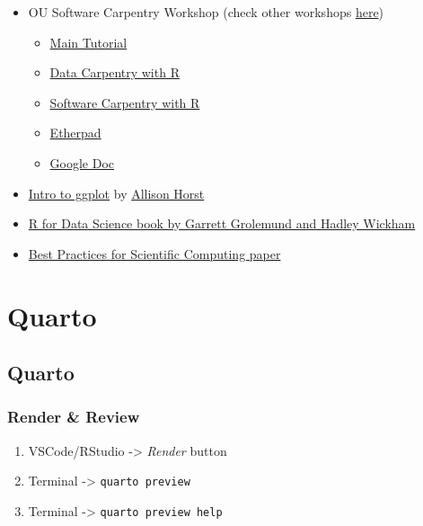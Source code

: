 \documentclass[
  letterpaper,
  DIV=11,
  numbers=noendperiod]{scrreprt}
\providecommand{\tightlist}{%
  \setlength{\itemsep}{0pt}\setlength{\parskip}{0pt}}\usepackage{longtable,booktabs,array}
\begin{document}
\begin{itemize}
\tightlist
\item
  OU Software Carpentry Workshop (check other workshops
  \href{https://libraries.ou.edu/content/software-and-data-carpentry}{here})

  \begin{itemize}
  \tightlist
  \item
    \href{https://oulib-swc.github.io/2019-05-15-ou-swc/}{Main Tutorial}
  \item
    \href{https://datacarpentry.org/R-ecology-lesson/index.html}{Data
    Carpentry with R}
  \item
    \href{https://swcarpentry.github.io/r-novice-gapminder/}{Software
    Carpentry with R}
  \item
    \href{https://pad.carpentries.org/2019-05-15-ou-swc}{Etherpad}
  \item
    \href{https://docs.google.com/document/d/1aJq_X1uhaNkUj7qdZEzOcpc2Pky7eZPy76yqs0UkfrQ/edit}{Google
    Doc}
  \end{itemize}
\item
  \href{https://rawcdn.githack.com/allisonhorst/data-vis/fc107e063f50ef8695b0a75ed73d74720aca2c65/data_vis_np.html}{Intro
  to ggplot} by \href{https://github.com/allisonhorst}{Allison Horst}
\item
  \href{https://r4ds.had.co.nz/}{R for Data Science book by Garrett
  Grolemund and Hadley Wickham}
\item
  \href{http://journals.plos.org/plosbiology/article?id=10.1371/journal.pbio.1001745}{Best
  Practices for Scientific Computing paper}
\end{itemize}

\part{Quarto}

\chapter{Quarto}\label{quarto-1}

\section{Render \& Review}\label{render-review}

\begin{enumerate}
\def\labelenumi{\arabic{enumi}.}
\tightlist
\item
  VSCode/RStudio -\textgreater{} \emph{Render} button
\item
  Terminal -\textgreater{} \texttt{quarto\ preview}
\item
  Terminal -\textgreater{} \texttt{quarto\ preview\ help}
\end{enumerate}
\end{document}
